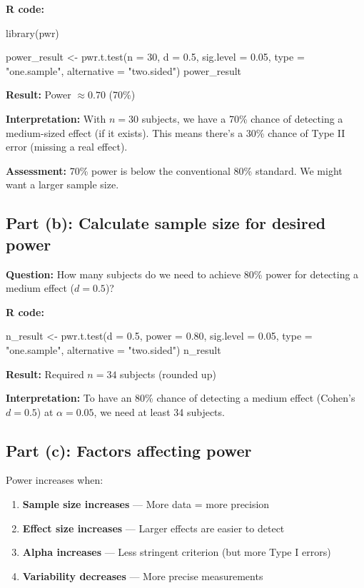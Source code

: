 \documentclass[11pt]{article}
\begin{document}
\textbf{R code:}
\begin{rcode}
library(pwr)

power_result <- pwr.t.test(n = 30,
                            d = 0.5,
                            sig.level = 0.05,
                            type = "one.sample",
                            alternative = "two.sided")
power_result
\end{rcode}

\textbf{Result:} Power $\approx 0.70$ (70\%)

\textbf{Interpretation:} With $n = 30$ subjects, we have a 70\% chance of detecting a medium-sized effect (if it exists). This means there's a 30\% chance of Type II error (missing a real effect).

\textbf{Assessment:} 70\% power is below the conventional 80\% standard. We might want a larger sample size.

\subsection*{Part (b): Calculate sample size for desired power}

\textbf{Question:} How many subjects do we need to achieve 80\% power for detecting a medium effect ($d = 0.5$)?

\textbf{R code:}
\begin{rcode}
n_result <- pwr.t.test(d = 0.5,
                        power = 0.80,
                        sig.level = 0.05,
                        type = "one.sample",
                        alternative = "two.sided")
n_result
\end{rcode}

\textbf{Result:} Required $n = 34$ subjects (rounded up)

\textbf{Interpretation:} To have an 80\% chance of detecting a medium effect (Cohen's $d = 0.5$) at $\alpha = 0.05$, we need at least 34 subjects.

\subsection*{Part (c): Factors affecting power}

Power increases when:
\begin{enumerate}
\item \textbf{Sample size increases} --- More data = more precision
\item \textbf{Effect size increases} --- Larger effects are easier to detect
\item \textbf{Alpha increases} --- Less stringent criterion (but more Type I errors)
\item \textbf{Variability decreases} --- More precise measurements
\end{enumerate}
\end{document}
